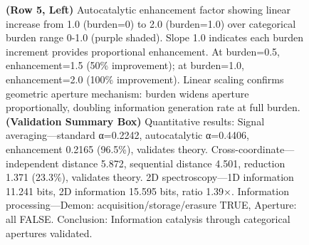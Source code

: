 \begin{figure}[htbp]
{    \textbf{(Row 5, Left)} Autocatalytic enhancement factor showing linear increase from 1.0 (burden=0) to 2.0 (burden=1.0) over categorical burden range 0-1.0 (purple shaded). Slope 1.0 indicates each burden increment provides proportional enhancement. At burden=0.5, enhancement=1.5 (50\% improvement); at burden=1.0, enhancement=2.0 (100\% improvement). Linear scaling confirms geometric aperture mechanism: burden widens aperture proportionally, doubling information generation rate at full burden. 
    \textbf{(Validation Summary Box)} Quantitative results: Signal averaging—standard α=0.2242, autocatalytic α=0.4406, enhancement 0.2165 (96.5\%), validates theory. Cross-coordinate—independent distance 5.872, sequential distance 4.501, reduction 1.371 (23.3\%), validates theory. 2D spectroscopy—1D information 11.241 bits, 2D information 15.595 bits, ratio 1.39×. Information processing—Demon: acquisition/storage/erasure TRUE, Aperture: all FALSE. Conclusion: Information catalysis through categorical apertures validated.}
    \label{fig:information_catalysis_validation}
\end{figure}

